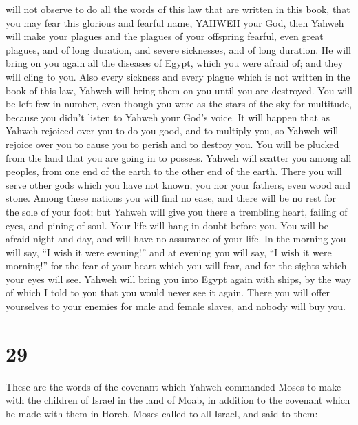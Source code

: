 will not observe to do all the words of this law that are written in
this book, that you may fear this glorious and fearful name, YAHWEH your
God,  then Yahweh will make your plagues and the plagues of
your offspring fearful, even great plagues, and of long duration, and
severe sicknesses, and of long duration.  He will bring on
you again all the diseases of Egypt, which you were afraid of; and they
will cling to you.  Also every sickness and every plague
which is not written in the book of this law, Yahweh will bring them on
you until you are destroyed.  You will be left few in
number, even though you were as the stars of the sky for multitude,
because you didn't listen to Yahweh your God's voice.  It
will happen that as Yahweh rejoiced over you to do you good, and to
multiply you, so Yahweh will rejoice over you to cause you to perish and
to destroy you. You will be plucked from the land that you are going in
to possess.  Yahweh will scatter you among all peoples,
from one end of the earth to the other end of the earth. There you will
serve other gods which you have not known, you nor your fathers, even
wood and stone.  Among these nations you will find no ease,
and there will be no rest for the sole of your foot; but Yahweh will
give you there a trembling heart, failing of eyes, and pining of soul.
 Your life will hang in doubt before you. You will be
afraid night and day, and will have no assurance of your life.
 In the morning you will say, ``I wish it were evening!''
and at evening you will say, ``I wish it were morning!'' for the fear of
your heart which you will fear, and for the sights which your eyes will
see.  Yahweh will bring you into Egypt again with ships, by
the way of which I told to you that you would never see it again. There
you will offer yourselves to your enemies for male and female slaves,
and nobody will buy you.

\hypertarget{section-28}{%
\section{29}\label{section-28}}

 These are the words of the covenant which Yahweh commanded
Moses to make with the children of Israel in the land of Moab, in
addition to the covenant which he made with them in Horeb. 
Moses called to all Israel, and said to them:

